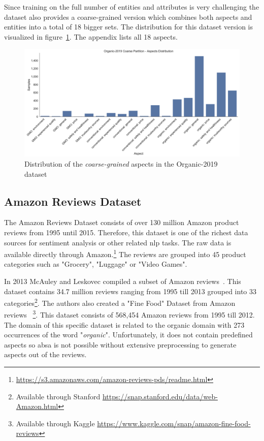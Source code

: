 Since training on the full number of entities and attributes is very challenging the dataset also provides a coarse-grained version which combines both aspects and entities into a total of 18 bigger sets. The distribution for this dataset version is visualized in figure~\ref{fig:05_organic2019_coarse}. The appendix lists all 18 aspects.

\begin{figure}[ht]
    \centering
    \includegraphics[width=\textwidth]{figures/05_setup/05_organicCoarseGrained}
    \caption{Distribution of the \textit{coarse-grained} aspects in the Organic-2019 dataset}
    \label{fig:05_organic2019_coarse}
\end{figure}

\subsection{Amazon Reviews Dataset}
\label{sec:05_amazonReviews}
The Amazon Reviews Dataset consists of over 130 million Amazon product reviews from 1995 until 2015. Therefore, this dataset is one of the richest data sources for sentiment analysis or other related \gls{nlp} tasks. The raw data is available directly through Amazon.\footnote{\url{https://s3.amazonaws.com/amazon-reviews-pds/readme.html}} The reviews are grouped into 45 product categories such as "Grocery", "Luggage" or "Video Games". 
\medskip

In 2013 McAuley and Leskovec compiled a subset of Amazon reviews~\cite{McAuley2013}. This dataset contains 34.7 million reviews ranging from 1995 till 2013 grouped into 33 categories\footnote{Available through Stanford \url{https://snap.stanford.edu/data/web-Amazon.html}}. The authors also created a "Fine Food" Dataset from Amazon reviews~\cite{McAuley2013a} \footnote{Available through Kaggle \url{https://www.kaggle.com/snap/amazon-fine-food-reviews}}. This dataset consists of 568,454 Amazon reviews from 1995 till 2012. The domain of this specific dataset is related to the organic domain with 273 occurrences of the word "\textit{organic}". Unfortunately, it does not contain predefined aspects so \gls{absa} is not possible without extensive preprocessing to generate aspects out of the reviews.
\medskip

